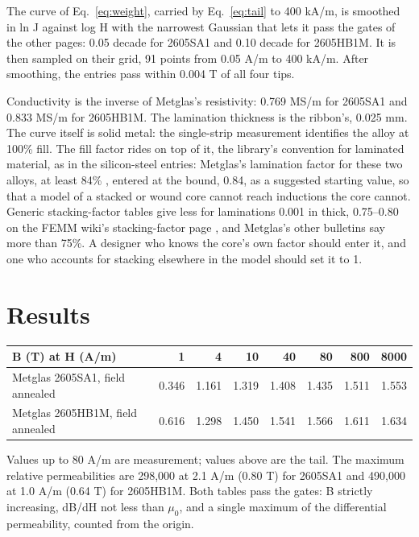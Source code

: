 \documentclass[
  11pt,
]{article}
\begin{document}
The curve of Eq.~\eqref{eq:weight}, carried by Eq.~\eqref{eq:tail} to 400 kA/m, is smoothed in ln J against log H with the narrowest Gaussian that lets it pass the gates of the other pages: 0.05 decade for 2605SA1 and 0.10 decade for 2605HB1M. It is then sampled on their grid, 91 points from 0.05 A/m to 400 kA/m. After smoothing, the entries pass within 0.004 T of all four tips.

Conductivity is the inverse of Metglas's resistivity: 0.769 MS/m for 2605SA1 and 0.833 MS/m for 2605HB1M. The lamination thickness is the ribbon's, 0.025 mm. The curve itself is solid metal: the single-strip measurement identifies the alloy at 100\% fill. The fill factor rides on top of it, the library's convention for laminated material, as in the silicon-steel entries: Metglas's lamination factor for these two alloys, at least 84\% \cite{metglas2011}, entered at the bound, 0.84, as a suggested starting value, so that a model of a stacked or wound core cannot reach inductions the core cannot. Generic stacking-factor tables give less for laminations 0.001 in thick, 0.75--0.80 on the FEMM wiki's stacking-factor page \cite{femm-stacking}, and Metglas's other bulletins say more than 75\%. A designer who knows the core's own factor should enter it, and one who accounts for stacking elsewhere in the model should set it to 1.

\section{Results}\label{results}

\begin{center}
\begin{tabular}{lrrrrrrr}
\toprule
B (T) at H (A/m) & 1 & 4 & 10 & 40 & 80 & 800 & 8000 \\
\midrule
Metglas 2605SA1, field annealed & 0.346 & 1.161 & 1.319 & 1.408 & 1.435 & 1.511 & 1.553 \\
Metglas 2605HB1M, field annealed & 0.616 & 1.298 & 1.450 & 1.541 & 1.566 & 1.611 & 1.634 \\
\bottomrule
\end{tabular}
\end{center}

Values up to 80 A/m are measurement; values above are the tail. The maximum relative permeabilities are 298,000 at 2.1 A/m (0.80 T) for 2605SA1 and 490,000 at 1.0 A/m (0.64 T) for 2605HB1M. Both tables pass the gates: B strictly increasing, dB/dH not less than \(\mu_0\), and a single maximum of the differential permeability, counted from the origin.
\end{document}

